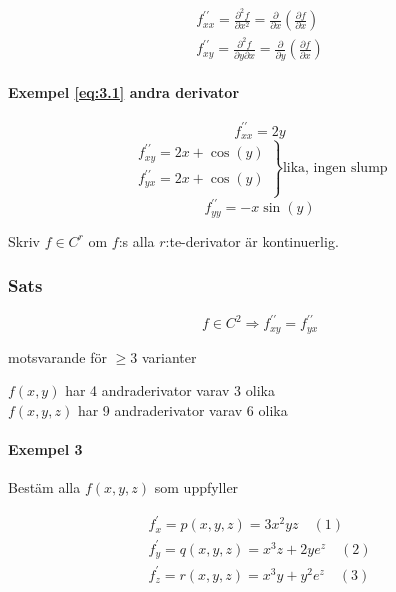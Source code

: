 \documentclass{article}
\begin{document}
\[
\begin{split}
	f_{xx}^{\prime\prime} = \frac{\partial^2f}{\partial x^2} = \frac{\partial}{\partial x} \left(\frac{\partial f}{\partial x}\right) \\
	f_{xy}^{\prime\prime} = \frac{\partial^2f}{\partial y\partial x} = \frac{\partial}{\partial y} \left(\frac{\partial f}{\partial x}\right)
\end{split}
\]

\paragraph{Exempel \eqref{eq:3.1} andra derivator}

\[
	f_{xx}^{\prime\prime} = 2y
\]
\[
\left.\begin{array}{rcl}
	f_{xy}^{\prime\prime} = 2x + \cos(y) \\
	f_{yx}^{\prime\prime} = 2x + \cos(y)\\
\end{array}\right\}\text{lika, ingen slump}
\]
\[
	f_{yy}^{\prime\prime} = -x\sin(y)
\]

Skriv \(f\in C^r\) om \(f\):s alla \(r\):te-derivator är kontinuerlig.

\subsubsection{Sats}

\[
	f \in C^2 \Rightarrow f_{xy}^{\prime\prime} = f_{yx}^{\prime\prime}
\]

motsvarande för \(\geq 3\) varianter \newline

\(f(x,y)\) har 4 andraderivator varav 3 olika \\
\(f(x,y,z)\) har 9 andraderivator varav 6 olika

\newpage

\paragraph{Exempel 3}

Bestäm alla \(f(x,y,z)\) som uppfyller

\begin{equation}
\begin{split}
	f_{x}^{\prime} = p(x,y,z) = 3x^2yz \quad (1) \\
	f_{y}^{\prime} = q(x,y,z) = x^3z + 2ye^z \quad (2) \\
	f_{z}^{\prime} = r(x,y,z) = x^3y + y^2e^z \quad (3) 
\end{split}
\end{equation}
\end{document}
